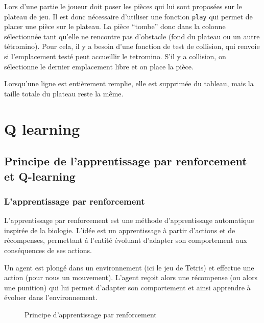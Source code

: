 \documentclass{report}
\begin{document}
Lors d'une partie le joueur doit poser les pièces qui lui sont proposées sur
le plateau de jeu. Il est donc nécessaire d'utiliser une fonction \texttt{play}
qui permet de placer une pièce sur le plateau. La pièce ``tombe'' donc dans la
colonne sélectionnée tant qu'elle ne rencontre pas d'obstacle (fond du plateau
ou un autre tétromino). Pour cela, il y a besoin d'une fonction de test de
collision, qui renvoie si l'emplacement testé peut accueillir le tetromino.
S'il y a collision, on sélectionne le dernier emplacement libre et on place la
pièce.

Lorsqu'une ligne est entièrement remplie, elle est supprimée du tableau, mais
la taille totale du plateau reste la même.


\chapter{Q learning}

\section{Principe de l'apprentissage par renforcement et Q-learning}
\subsection{L'apprentissage par renforcement}

L'apprentissage par renforcement est une méthode d'apprentissage automatique
inspirée de la biologie. L'idée est un apprentissage à partir d'actions et
de récompenses, permettant \'a l'entité évoluant d'adapter son comportement aux
conséquences de ses actions.

Un agent est plongé dans un environnement (ici le jeu de Tetris) et effectue une
action (pour nous un mouvement). L'agent reçoit alors une récompense (ou alors
une punition) qui lui permet d'adapter son comportement et ainsi apprendre à
évoluer dans l'environnement.

\begin{figure}[h]
    \begin{center}
    \end{center}

    \caption{Principe d'apprentissage par renforcement}
    \label{}
\end{figure}
\end{document}
